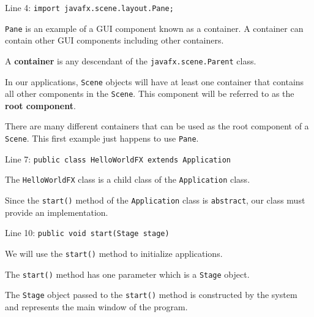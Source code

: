 \documentclass{beamer}
\newcommand{\mil}[1]{\texttt{#1}}
\begin{document}
\begin{frame}[fragile]

    Line 4:  \mil{import javafx.scene.layout.Pane;}    
       
    \bigskip
           
    \mil{Pane} is an example of a GUI component known as a container.  A container can contain other GUI components including other containers.
    
    \bigskip
 
     A \textbf{container} is any descendant of the \mil{javafx.scene.Parent} class.
     
     \bigskip
     
     In our applications, \mil{Scene} objects will have at least one container that contains all other components in the \mil{Scene}.  This component will be referred to as the \textbf{root component}.
     
     \bigskip     
     
     There are many different containers that can be used as the root component of a \mil{Scene}.  This first example just happens to use \mil{Pane}.
     
\end{frame}

\begin{frame}[fragile]

    Line 7:  \mil{public class HelloWorldFX extends Application}
    
    \bigskip
    
    The \mil{HelloWorldFX} class is a child class of the \mil{Application} class.
    
    \bigskip
    
    Since the \mil{start()} method of the \mil{Application} class is \mil{abstract}, our class must provide an implementation.
    
\end{frame}

\begin{frame}

    Line 10:  \mil{public void start(Stage stage)}
    
    \bigskip
    
    We will use the \mil{start()} method to initialize applications.
    
    \bigskip
    
    The \mil{start()} method has one parameter which is a \mil{Stage} object.  
    
    \bigskip
    
    The \mil{Stage} object passed to the \mil{start()} method is constructed by the system and represents the main window of the program.
         
\end{frame}
\end{document}
